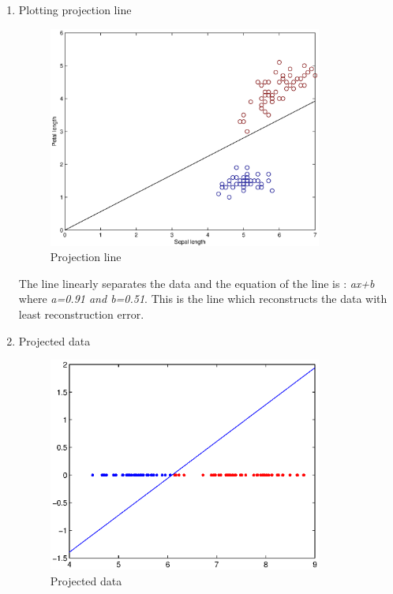 \documentclass[a4paper]{article}
\begin{document}
\begin{enumerate}
\item Plotting projection line

\begin{figure}[H]
	\begin{center}
		\includegraphics[width=0.85\textwidth]{Ex4.eps}
		\caption{Projection line}\label{fig:projline}		
	\end{center}
\end{figure}

	The line linearly separates the data and the equation of the line is : \newline
	\textit{ax+b} where \textit{a=0.91 and b=0.51}. \newline
	This is the line which reconstructs the data with least reconstruction error.

\item Projected data

\begin{figure}[H]
	\begin{center}
		\includegraphics[width=0.85\textwidth]{Ex5.eps}
		\caption{Projected data}\label{fig:projdata}		
	\end{center}
\end{figure}


\end{enumerate}
\end{document}
